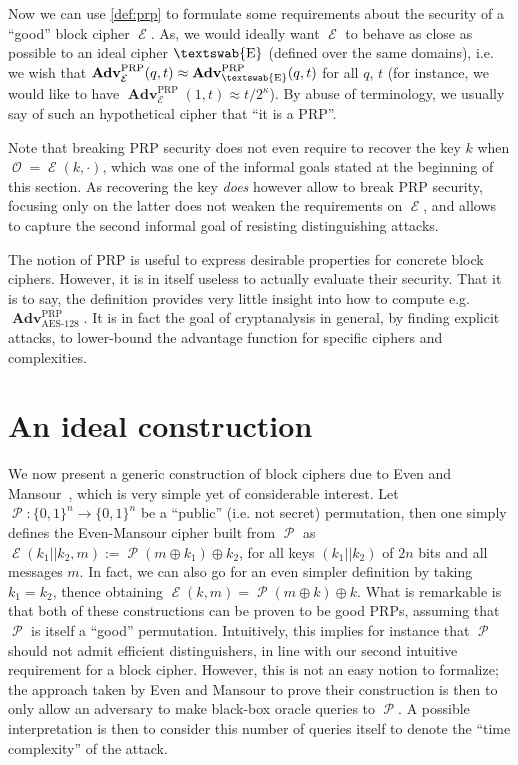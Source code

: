 \documentclass[11pt,a4paper]{article}
\theoremstyle{definition}
\DeclareMathOperator\E{\mathcal{E}}
\DeclareMathOperator\Perm{\mathcal{P}}
\DeclareMathOperator\ora{\mathcal{O}}
\DeclareMathOperator\iE{\textswab{E}}
\DeclareMathOperator\Adv{\mathbf{Adv}}
\DeclareMathOperator\aes{AES-128}
\newcommand\msb{\{0,1\}^n}
\begin{document}
Now we can use \autoref{def:prp} to formulate some requirements about the security of a ``good'' block cipher $\E$. As, we would
ideally want $\E$ to behave as close as possible to an ideal cipher $\iE$ (defined over the same domains), i.e. we wish that
$\Adv^\text{PRP}_{\E}(q,t) \approx \Adv^\text{PRP}_{\iE}(q,t)$ for all $q$, $t$ (for instance, we would like to
have $\Adv^\text{PRP}_{\E}(1,t) \approx t/2^\kappa$). By abuse of terminology, we usually say of such an
hypothetical cipher that ``it is a PRP''.

Note that breaking PRP security does not even require to recover the key $k$ when $\ora = \E(k,\cdot)$, which was one of the informal
goals stated at the beginning of this section. As recovering the key \emph{does} however allow to break PRP security, focusing only
on the latter does not weaken the requirements on $\E$, and allows to capture the second informal goal of resisting distinguishing
attacks.

The notion of PRP is useful to express desirable properties for concrete block ciphers. However, it is in itself useless to actually
evaluate their security. That it is to say, the definition provides very little insight into how to compute e.g. $\Adv^\text{PRP}_{\aes}$.
It is in fact the goal of cryptanalysis in general, by finding explicit attacks, to lower-bound the advantage function for specific ciphers
and complexities.


\section{An ideal construction}

We now present a generic construction of block ciphers due to Even and Mansour~\cite{DBLP:conf/asiacrypt/EvenM91,DBLP:journals/joc/EvenM97}, which is very simple yet of considerable interest.
Let $\Perm : \msb \rightarrow \msb$ be a ``public'' (i.e. not secret) permutation, then one simply defines the
Even-Mansour cipher built from $\Perm$ as $\E(k_1||k_2,m) := \Perm(m \oplus k_1) \oplus k_2$, for all keys $(k_1||k_2)$
of $2n$ bits and all messages $m$. In fact, we can also go for an even simpler definition by taking $k_1 = k_2$, thence
obtaining $\E(k, m) = \Perm(m \oplus k) \oplus k$. What is remarkable is that both of these constructions can be proven
to be  good PRPs, assuming that $\Perm$ is itself a ``good'' permutation. Intuitively, this implies for instance
that $\Perm$ should not admit efficient distinguishers, in line with our second intuitive requirement for a block cipher.
However, this is not an easy notion to formalize; the approach taken by Even and Mansour to prove their construction
is then to only allow an adversary to make black-box oracle queries to $\Perm$. A possible interpretation
is then to consider this number of queries
itself to denote the ``time complexity'' of the attack.
\end{document}
